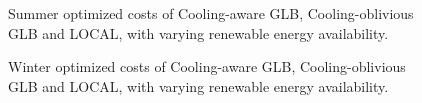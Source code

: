 \documentclass[xcolor=dvipsnames]{beamer}
\begin{document}
\begin{frame}{}
	\begin{figure}
	\centering
	\caption{Summer optimized costs of Cooling-aware GLB, Cooling-oblivious GLB and LOCAL, with varying renewable energy availability.}
	\end{figure}
\end{frame}

\begin{frame}{}
	\begin{figure}
	\centering
	\caption{Winter optimized costs of Cooling-aware GLB, Cooling-oblivious GLB and LOCAL, with varying renewable energy availability.}
	\end{figure}
\end{frame}
\end{document}
